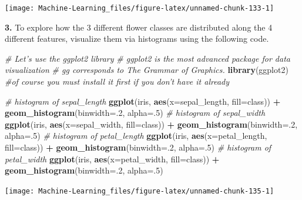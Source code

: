 \documentclass[]{book}
\newenvironment{Shaded}{\begin{snugshade}}{\end{snugshade}}
\newcommand{\KeywordTok}[1]{\textcolor[rgb]{0.13,0.29,0.53}{\textbf{#1}}}
\newcommand{\DataTypeTok}[1]{\textcolor[rgb]{0.13,0.29,0.53}{#1}}
\newcommand{\DecValTok}[1]{\textcolor[rgb]{0.00,0.00,0.81}{#1}}
\newcommand{\StringTok}[1]{\textcolor[rgb]{0.31,0.60,0.02}{#1}}
\newcommand{\CommentTok}[1]{\textcolor[rgb]{0.56,0.35,0.01}{\textit{#1}}}
\newcommand{\OperatorTok}[1]{\textcolor[rgb]{0.81,0.36,0.00}{\textbf{#1}}}
\newcommand{\NormalTok}[1]{#1}
\theoremstyle{definition}
\theoremstyle{definition}
\theoremstyle{definition}
\theoremstyle{remark}
\begin{document}
\begin{center}\texttt{[image: Machine-Learning\_files/figure-latex/unnamed-chunk-133-1]} \end{center}

\textbf{3.} To explore how the 3 different flower classes are
distributed along the 4 different features, visualize them via
histograms using the following code.

\begin{Shaded}
\begin{Highlighting}[]
\CommentTok{# Let's use the ggplot2 library}
\CommentTok{# ggplot2 is the most advanced package for data visualization}
\CommentTok{# gg corresponds to The Grammar of Graphics.}
\KeywordTok{library}\NormalTok{(ggplot2) }\CommentTok{#of course you must install it first if you don't have it already}

\CommentTok{# histogram of sepal_length}
\KeywordTok{ggplot}\NormalTok{(iris, }\KeywordTok{aes}\NormalTok{(}\DataTypeTok{x=}\NormalTok{sepal_length, }\DataTypeTok{fill=}\NormalTok{class)) }\OperatorTok{+}
\StringTok{  }\KeywordTok{geom_histogram}\NormalTok{(}\DataTypeTok{binwidth=}\NormalTok{.}\DecValTok{2}\NormalTok{, }\DataTypeTok{alpha=}\NormalTok{.}\DecValTok{5}\NormalTok{)}
\CommentTok{# histogram of sepal_width}
\KeywordTok{ggplot}\NormalTok{(iris, }\KeywordTok{aes}\NormalTok{(}\DataTypeTok{x=}\NormalTok{sepal_width, }\DataTypeTok{fill=}\NormalTok{class)) }\OperatorTok{+}
\StringTok{  }\KeywordTok{geom_histogram}\NormalTok{(}\DataTypeTok{binwidth=}\NormalTok{.}\DecValTok{2}\NormalTok{, }\DataTypeTok{alpha=}\NormalTok{.}\DecValTok{5}\NormalTok{)}
\CommentTok{# histogram of petal_length}
\KeywordTok{ggplot}\NormalTok{(iris, }\KeywordTok{aes}\NormalTok{(}\DataTypeTok{x=}\NormalTok{petal_length, }\DataTypeTok{fill=}\NormalTok{class)) }\OperatorTok{+}
\StringTok{  }\KeywordTok{geom_histogram}\NormalTok{(}\DataTypeTok{binwidth=}\NormalTok{.}\DecValTok{2}\NormalTok{, }\DataTypeTok{alpha=}\NormalTok{.}\DecValTok{5}\NormalTok{)}
\CommentTok{# histogram of petal_width}
\KeywordTok{ggplot}\NormalTok{(iris, }\KeywordTok{aes}\NormalTok{(}\DataTypeTok{x=}\NormalTok{petal_width, }\DataTypeTok{fill=}\NormalTok{class)) }\OperatorTok{+}
\StringTok{  }\KeywordTok{geom_histogram}\NormalTok{(}\DataTypeTok{binwidth=}\NormalTok{.}\DecValTok{2}\NormalTok{, }\DataTypeTok{alpha=}\NormalTok{.}\DecValTok{5}\NormalTok{)}
\end{Highlighting}
\end{Shaded}

\begin{center}\texttt{[image: Machine-Learning\_files/figure-latex/unnamed-chunk-135-1]} \end{center}
\end{document}
